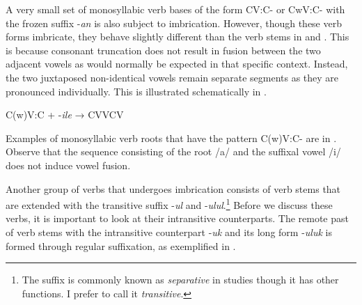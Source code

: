 \documentclass[output=paper]{langsci/langscibook}
\begin{document}
A very small set of monosyllabic verb bases of the form CV:C- or CwV:C- with the frozen suffix -\textit{an} is also subject to imbrication. However, though these verb forms imbricate, they behave slightly different than the verb stems in  and . This is because consonant truncation does not result in fusion between the two adjacent vowels as would normally be expected in that specific context. Instead, the two juxtaposed non-identical vowels remain separate segments as they are pronounced individually. This is illustrated schematically in . 

\ea
\label{ex:6.kawasha}
C(w)V:C + -\textit{ile}  → CVVCV
\z

Examples of monosyllabic verb roots that have the pattern C(w)V:C- are in . Observe that the sequence consisting of the root /a/ and the suffixal vowel /i/ does not induce vowel fusion. 

\begin{table}

\caption{Imbrication in monosyllabic C(w)V:C- roots}
\label{tab:21.kawasha}

\end{table}


Another group of verbs that undergoes imbrication consists of verb stems that are extended with the transitive suffix -\textit{ul }and -\textit{ulul}.\footnote{The suffix is commonly known as \textit{separative} in  studies though it has other functions. I prefer to call it \textit{transitive}.} Before we discuss these verbs, it is important to look at their intransitive counterparts. The remote past of verb stems with the intransitive counterpart -\textit{uk} and its long form -\textit{uluk} is formed through regular suffixation, as exemplified in .
\end{document}
